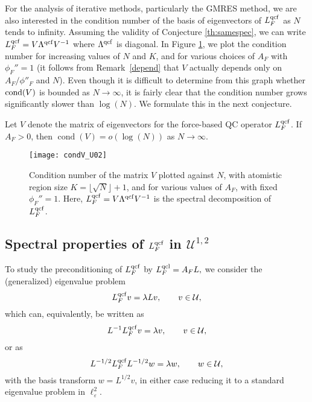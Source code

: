 \documentclass[12pt,reqno]{amsart}
\newcounter{theorem}
\newenvironment{conjecture}[1][!]{{\refstepcounter{theorem}\bigskip

{\noindent\bf{Conjecture}~\thetheorem\if{#1}!{. }\else{ ({#1}).}\fi}
\it}}{}
\begin{document}
\medskip For the analysis of iterative methods, particularly the GMRES
method, we are also interested in the condition number of the basis of
eigenvectors of ${L^{{\rm qcf}}_F}$ as $N$ tends to infinity. Assuming the
validity of Conjecture \ref{th:samespec}, we can write ${L^{{\rm qcf}}_F} = V
\Lambda^{{\rm qcf}} V^{-1}$ where $\Lambda^{{\rm qcf}}$ is
diagonal. In Figure \ref{fig:condV_U02}, we plot the condition number
for increasing values of $N$ and $K$, and for various choices of
$A_F$ with $\phi_{F}''=1$ (it follows from Remark~\ref{depend}
that $V$ actually depends only on $A_F/\phi''_F$ and $N$). Even though it is difficult to determine
from this graph whether ${\rm cond}(V)$ is bounded as $N \to \infty$,
it is fairly clear that the condition number grows significantly
slower than $\log(N)$. We formulate this in the next conjecture.

\begin{conjecture}
  \label{th:qcf:cond_U02}
  Let $V$ denote the matrix of eigenvectors for the force-based QC
  operator ${L^{{\rm qcf}}_F}$. If $A_F > 0$, then $\operatorname{cond}(V) = o\left(\log(N)\right)$ as $N
  \to \infty$.
\end{conjecture}

\begin{figure}
  \begin{center}
    \texttt{[image: condV\_U02]}
    \caption{\label{fig:condV_U02} Condition number of the matrix $V$
      plotted against $N$, with atomistic region size $K =
      \lfloor\sqrt{N}\rfloor + 1$, and for various values of $A_F$,
      with fixed $\phi_{F}''=1$. Here, ${L^{{\rm qcf}}_F} = V \Lambda^{{\rm qcf}}
      V^{-1}$ is the spectral decomposition of ${L^{{\rm qcf}}_F}$. }
  \end{center}
\end{figure}

\medskip

\subsection{Spectral properties of ${L^{{\rm qcf}}_F}$ in ${\mathcal{U}}^{1,2}$}
\label{sec:qcf:U12}
To study the preconditioning of ${L^{{\rm qcf}}_F}$ by
${L^{{\rm qcl}}_F}=A_F{{L}},$ we consider
the (generalized) eigenvalue problem
\begin{equation}
  \label{eq:defn_U12-evals}
  {L^{{\rm qcf}}_F} v = \lambda {{L}} v,\qquad v\in{\mathcal{U}},
\end{equation}
which can, equivalently, be written as
\begin{equation}\label{eigv}
  {{L}}^{-1} {L^{{\rm qcf}}_F} v = \lambda v, \qquad v \in {\mathcal{U}},
\end{equation}
or as
\begin{equation}\label{eigw}
  {{L}}^{-1/2} {L^{{\rm qcf}}_F} {{L}}^{-1/2} w = \lambda w,\qquad w\in{\mathcal{U}},
\end{equation}
with the basis transform $w = {{L}}^{1/2} v$, in either case reducing it
to a standard eigenvalue problem in $\ell^2_{\varepsilon}$.
\end{document}
